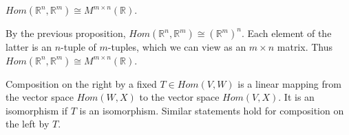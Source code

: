 \documentclass[12pt,letterpaper,reqno]{article}
\numberwithin{equation}{section}
\begin{document}
\begin{prop}\label{prop:r_n_to_r_m_rep_by_matrix}
	$Hom(\mathbb{R}^n,\mathbb{R}^m) \cong M^{m \times n}(\mathbb{R})$.
\end{prop} 

\begin{pf}
	By the previous proposition, $Hom(\mathbb{R}^n,\mathbb{R}^m) \cong (\mathbb{R}^m)^n$. Each element of the latter is an $n$-tuple of $m$-tuples, which we can view as an $m \times n$ matrix. Thus  $Hom(\mathbb{R}^n,\mathbb{R}^m) \cong M^{m \times n}(\mathbb{R})$.
\end{pf}

\begin{lem}
Composition on the right by a fixed $T \in Hom(V,W)$ is a linear mapping from the vector space $Hom(W,X)$ to the vector space $Hom(V,X)$. It is an isomorphism if $T$ is an isomorphism. Similar statements hold for composition on the left by $T$.
\end{lem}
\end{document}
